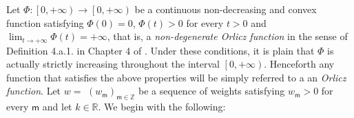 \documentclass{article}
\begin{document}
Let $\Phi :\left[ 0,+\infty \right) \rightarrow \left[ 0,+\infty \right) $
be a continuous non-decreasing and convex function satisfying $\Phi \left(
0\right) =0$, $\Phi \left( t\right) >0$ for every $t>0$ and $%
\lim_{t\rightarrow +\infty }\Phi \left( t\right) =+\infty $, that is, a 
\textit{non-degenerate Orlicz function} in the sense of Definition 4.a.1. in
Chapter 4 of \cite{lindenstrausstra}. Under these conditions, it is plain
that $\Phi $ is actually strictly increasing throughout the interval $\left[
0,+\infty \right) $. Henceforth any function that satisfies the above
properties will be simply referred to a an \textit{Orlicz function}. Let $w=$
$\left( w_{\mathsf{m}}\right) _{\mathsf{m}\in \mathbb{Z}}$ be a sequence of
weights satisfying $w_{\mathsf{m}}>0$ for every $\mathsf{m}$ and let $k\in 
\mathbb{R}$. We begin with the following:

\bigskip
\end{document}
